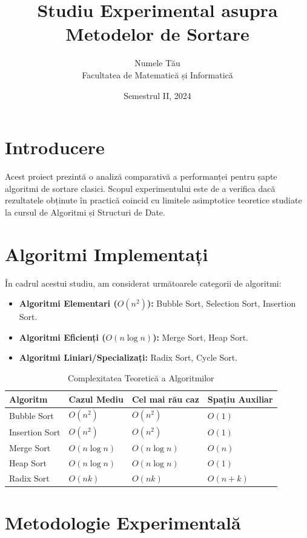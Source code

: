 \documentclass[12pt,a4paper]{article}
\title{Studiu Experimental asupra Metodelor de Sortare}
\author{Numele Tău \\ \small Facultatea de Matematică și Informatică}
\date{Semestrul II, 2024}
\begin{document}
\maketitle
\tableofcontents
\newpage

\section{Introducere}
Acest proiect prezintă o analiză comparativă a performanței pentru șapte algoritmi de sortare clasici. Scopul experimentului este de a verifica dacă rezultatele obținute în practică coincid cu limitele asimptotice teoretice studiate la cursul de Algoritmi și Structuri de Date.

\section{Algoritmi Implementați}
În cadrul acestui studiu, am considerat următoarele categorii de algoritmi:

\begin{itemize}
    \item \textbf{Algoritmi Elementari ($O(n^2)$):} Bubble Sort, Selection Sort, Insertion Sort.
    \item \textbf{Algoritmi Eficienți ($O(n \log n)$):} Merge Sort, Heap Sort.
    \item \textbf{Algoritmi Liniari/Specializați:} Radix Sort, Cycle Sort.
\end{itemize}

\begin{table}[h]
\centering
\caption{Complexitatea Teoretică a Algoritmilor}
\begin{tabular}{@{}llll@{}}
\toprule
Algoritm       & Cazul Mediu & Cel mai rău caz & Spațiu Auxiliar \\ \midrule
Bubble Sort    & $O(n^2)$    & $O(n^2)$        & $O(1)$          \\
Insertion Sort & $O(n^2)$    & $O(n^2)$        & $O(1)$          \\
Merge Sort     & $O(n \log n)$ & $O(n \log n)$ & $O(n)$          \\
Heap Sort      & $O(n \log n)$ & $O(n \log n)$ & $O(1)$          \\
Radix Sort     & $O(nk)$     & $O(nk)$         & $O(n+k)$        \\ \bottomrule
\end{tabular}
\end{table}

\section{Metodologie Experimentală}
\end{document}
